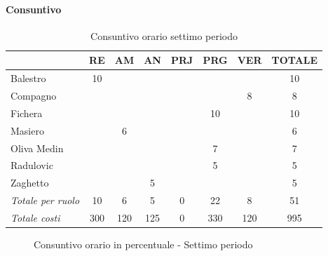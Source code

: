 \documentclass[a4paper,12pt]{article}
\begin{document}
            \paragraph{Consuntivo}
                \begin{table}[H]
                \centering
                \caption{Consuntivo orario settimo periodo}
                \begin{tabular}{|l|c|c|c|c|c|c|c|}
                \hline
                    \rowcolor{lightgray}{\textbf{Membro}} & {\textbf{RE}} & {\textbf{AM}} & {\textbf{AN}} & {\textbf{PRJ}} & {\textbf{PRG}} & {\textbf{VER}} & {\textbf{TOTALE}}\\
                \hline
                    Balestro & 10 & & & & & & 10\\
                \hline
                    Compagno & & & & & & 8 & 8\\
                \hline
                    Fichera & & & & & 10 & & 10\\
                \hline
                    Masiero & & 6 & & & & & 6\\
                \hline
                    Oliva Medin & & & & & 7 & & 7\\
                \hline
                    Radulovic & & & & & 5 & & 5\\
                \hline
                    Zaghetto & & & 5 & & & & 5\\
                \hline
                    \rowcolor{lightgray}\textit{Totale per ruolo} & 10 & 6 & 5 & 0 & 22 & 8 & 51\\
                \hline
                    \rowcolor{lightgray}\textit{Totale costi} & 300 & 120 & 125 & 0 & 330 & 120 & 995\\
                \hline
                \end{tabular}
                \end{table}

                \begin{figure}[H]
                \centering
                \caption{Consuntivo orario in percentuale - Settimo periodo}
                \end{figure}
                
\end{document}

